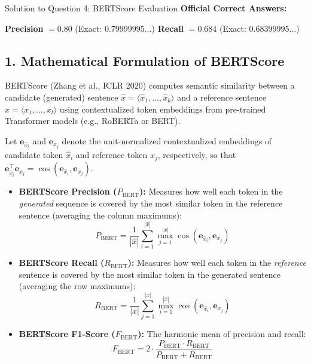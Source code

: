 \documentclass[11pt,a4paper]{article}
\begin{document}
\begin{solutionbox}{Solution to Question 4: BERTScore Evaluation}
\textbf{Official Correct Answers:}
\begin{center}
    \textbf{Precision} $= \mathbf{0.80}$ \quad (Exact: $0.79999995\dots$)\qquad\qquad
    \textbf{Recall} $= \mathbf{0.684}$ \quad (Exact: $0.68399995\dots$)
\end{center}

\medskip
\subsection*{1. Mathematical Formulation of BERTScore}
BERTScore (Zhang et al., ICLR 2020) computes semantic similarity between a candidate (generated) sentence $\hat{x} = \langle \hat{x}_1, \dots, \hat{x}_k \rangle$ and a reference sentence $x = \langle x_1, \dots, x_l \rangle$ using contextualized token embeddings from pre-trained Transformer models (e.g., RoBERTa or BERT).

Let $\mathbf{e}_{\hat{x}_i}$ and $\mathbf{e}_{x_j}$ denote the unit-normalized contextualized embeddings of candidate token $\hat{x}_i$ and reference token $x_j$, respectively, so that $\mathbf{e}_{\hat{x}_i}^\top \mathbf{e}_{x_j} = \cos(\mathbf{e}_{\hat{x}_i}, \mathbf{e}_{x_j})$.
\begin{itemize}[leftmargin=1.5em,itemsep=3pt]
    \item \textbf{BERTScore Precision ($P_{\text{BERT}}$):} Measures how well each token in the \textit{generated} sequence is covered by the most similar token in the reference sentence (averaging the column maximums):
    \begin{equation}
        P_{\text{BERT}} = \frac{1}{|\hat{x}|} \sum_{i=1}^{|\hat{x}|} \max_{j=1}^{|x|} \cos(\mathbf{e}_{\hat{x}_i}, \mathbf{e}_{x_j})
    \end{equation}
    \item \textbf{BERTScore Recall ($R_{\text{BERT}}$):} Measures how well each token in the \textit{reference} sentence is covered by the most similar token in the generated sentence (averaging the row maximums):
    \begin{equation}
        R_{\text{BERT}} = \frac{1}{|x|} \sum_{j=1}^{|x|} \max_{i=1}^{|\hat{x}|} \cos(\mathbf{e}_{\hat{x}_i}, \mathbf{e}_{x_j})
    \end{equation}
    \item \textbf{BERTScore F1-Score ($F_{\text{BERT}}$):} The harmonic mean of precision and recall:
    \begin{equation}
        F_{\text{BERT}} = 2 \cdot \frac{P_{\text{BERT}} \cdot R_{\text{BERT}}}{P_{\text{BERT}} + R_{\text{BERT}}}
    \end{equation}
\end{itemize}


\end{solutionbox}
\end{document}
